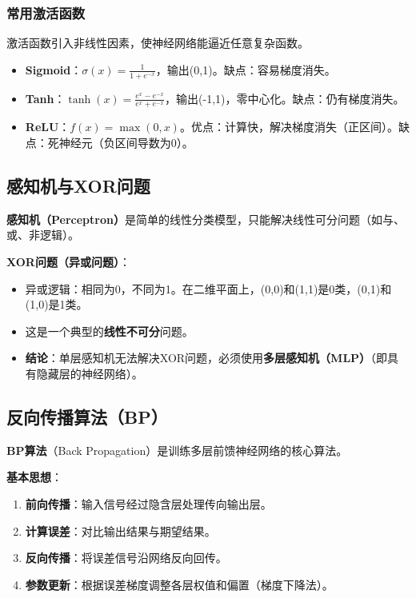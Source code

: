 \subsubsection{常用激活函数}
激活函数引入非线性因素，使神经网络能逼近任意复杂函数。
\begin{itemize}[leftmargin=2em,itemsep=0pt]
    \item \textbf{Sigmoid}：$\sigma(x) = \frac{1}{1+e^{-x}}$，输出(0,1)。缺点：容易梯度消失。
    \item \textbf{Tanh}：$\tanh(x) = \frac{e^x - e^{-x}}{e^x + e^{-x}}$，输出(-1,1)，零中心化。缺点：仍有梯度消失。
    \item \textbf{ReLU}：$f(x) = \max(0, x)$。优点：计算快，解决梯度消失（正区间）。缺点：死神经元（负区间导数为0）。
\end{itemize}

\subsection{感知机与XOR问题}

\textbf{感知机（Perceptron）}是简单的线性分类模型，只能解决线性可分问题（如与、或、非逻辑）。

\begin{notebox}
\textbf{XOR问题（异或问题）}：
\begin{itemize}[itemsep=0pt]
    \item 异或逻辑：相同为0，不同为1。在二维平面上，(0,0)和(1,1)是0类，(0,1)和(1,0)是1类。
    \item 这是一个典型的\textbf{线性不可分}问题。
    \item \textbf{结论}：单层感知机无法解决XOR问题，必须使用\textbf{多层感知机（MLP）}（即具有隐藏层的神经网络）。
\end{itemize}
\end{notebox}

\subsection{反向传播算法（BP）}

\textbf{BP算法}（Back Propagation）是训练多层前馈神经网络的核心算法。

\textbf{基本思想}：
\begin{enumerate}[leftmargin=2em,itemsep=0pt]
    \item \textbf{前向传播}：输入信号经过隐含层处理传向输出层。
    \item \textbf{计算误差}：对比输出结果与期望结果。
    \item \textbf{反向传播}：将误差信号沿网络反向回传。
    \item \textbf{参数更新}：根据误差梯度调整各层权值和偏置（梯度下降法）。
\end{enumerate}

